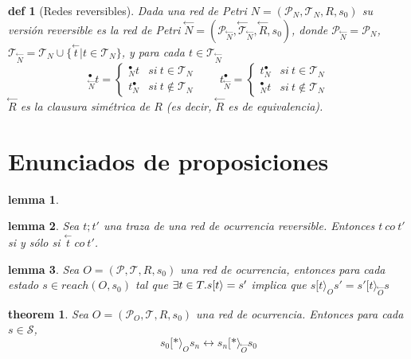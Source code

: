 \documentclass{article}
\newtheorem{defi}{def}
\newtheorem{teo}{theorem}
\newtheorem{lem}{lemma}
\newcommand{\Tr}{\mathcal{T}}
\newcommand{\Pl}{\mathcal{P}}
\newcommand{\St}{\mathcal{S}}
\newcommand{\rev}[1]{\overset{\leftarrow}{#1}}
\begin{document}
\begin{defi}[Redes reversibles]
\rm{Dada una red de Petri $N=(\Pl_{N},\Tr_N,R,s_0)$ su versión reversible es la red de Petri $\overset{\leftarrow}{N}=(\Pl_{\rev{N}},\rev{\Tr}_{\rev{N}},\rev{R},s_0)$, donde $\Pl_{\rev{N}}=\Pl_N$, $\Tr_{\rev{N}}=\Tr_N\cup\{\rev{t}|t\in \Tr_N\}$, y para cada $t\in \Tr_{\rev{N}}$ 
$$^{\bullet}_{\rev{N}} t=\begin{cases}^{\bullet}_N t & si \ t\in \Tr_N \\ t^{\bullet}_N & si \ t\notin \Tr_N\end{cases} \qquad  t^{\bullet}_{\rev{N}}=\begin{cases} t^{\bullet}_N & si \ t\in \Tr_N \\ ^{\bullet}_Nt & si \ t\notin \Tr_N\end{cases}$$ 
$\rev{R}$ es la clausura simétrica de $R$ (es decir, $\rev{R}$ es de equivalencia).}
\end{defi}

\section{Enunciados de proposiciones}

\begin{lem}
\end{lem}

\begin{lem}
Sea $t;t'$ una traza de una red de ocurrencia reversible. Entonces $t \ co \ t'$ si y sólo si $\rev{t} \ co \ t'$.
\end{lem}

\begin{lem}
Sea $O=(\Pl,\Tr,R,s_0)$ una red de ocurrencia, entonces para cada estado $s\in reach(O,s_0)$ tal que $\exists t\in \mathcal \Tr.s[t\rangle =s'$ implica que $s[t\rangle_O s' = s'[t\rangle_{\rev{O}} s$
\end{lem}

\begin{teo}
Sea $O=(\Pl_O,\Tr,R,s_0)$ una red de ocurrencia. Entonces para cada $s\in\St$,
$$s_0[*\rangle_O s_n \longleftrightarrow s_n[*\rangle_{\rev{O}} s_0$$
\end{teo}


\end{document}
